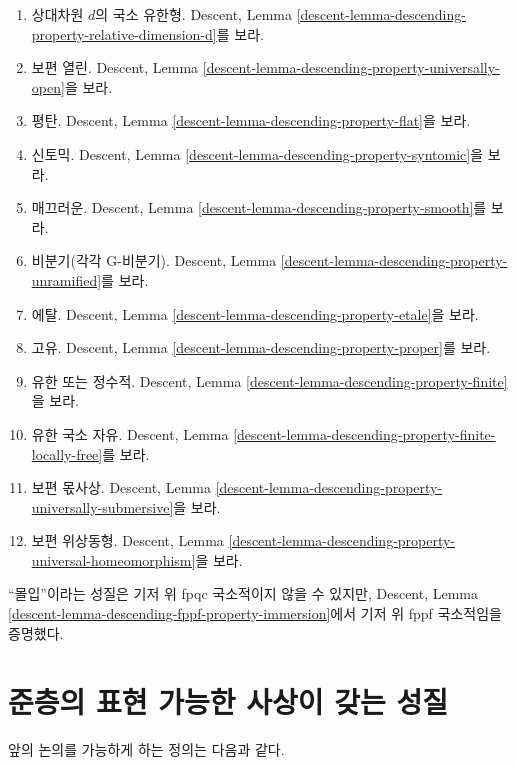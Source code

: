 \begin{remark}
\begin{enumerate}
\item 상대차원 $d$의 국소 유한형. Descent, Lemma
\ref{descent-lemma-descending-property-relative-dimension-d}를 보라.
\item 보편 열린. Descent, Lemma
\ref{descent-lemma-descending-property-universally-open}을 보라.
\item 평탄. Descent, Lemma
\ref{descent-lemma-descending-property-flat}을 보라.
\item 신토믹. Descent, Lemma
\ref{descent-lemma-descending-property-syntomic}을 보라.
\item 매끄러운. Descent, Lemma
\ref{descent-lemma-descending-property-smooth}를 보라.
\item 비분기(각각 G-비분기). Descent, Lemma
\ref{descent-lemma-descending-property-unramified}를 보라.
\item 에탈. Descent, Lemma
\ref{descent-lemma-descending-property-etale}을 보라.
\item 고유. Descent, Lemma
\ref{descent-lemma-descending-property-proper}를 보라.
\item 유한 또는 정수적. Descent, Lemma
\ref{descent-lemma-descending-property-finite}을 보라.
\item 유한 국소 자유. Descent, Lemma
\ref{descent-lemma-descending-property-finite-locally-free}를 보라.
\item 보편 몫사상. Descent, Lemma
\ref{descent-lemma-descending-property-universally-submersive}을 보라.
\item 보편 위상동형. Descent, Lemma
\ref{descent-lemma-descending-property-universal-homeomorphism}을 보라.
\end{enumerate}
``몰입''이라는 성질은 기저 위 fpqc 국소적이지 않을 수 있지만,
Descent, Lemma \ref{descent-lemma-descending-fppf-property-immersion}에서
기저 위 fppf 국소적임을 증명했다.
\end{remark}









\section{준층의 표현 가능한 사상이 갖는 성질}
\label{section-representable-properties}

\noindent
앞의 논의를 가능하게 하는 정의는 다음과 같다.

